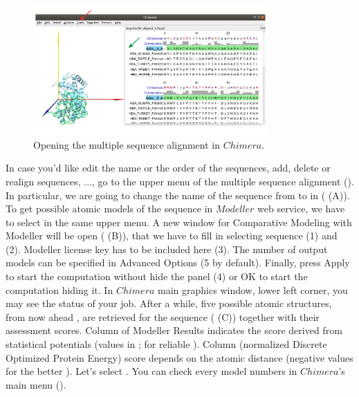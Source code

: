 \begin{itemize}
 \begin{figure}[H]
  \centering 
  \captionsetup{width=.7\linewidth} 
  \includegraphics[width=0.80\textwidth]{Images/Fig14}
  \caption{Opening the multiple sequence alignment in $Chimera$.}
  \label{fig:chimera_alignment}
  \end{figure}
\end{itemize}

In case you'd like edit the name or the order of the sequences, add,  delete or realign sequences, ..., go to the upper menu of the multiple sequence alignment (). In particular, we are going to change the name of the  sequence from  to  in  ( (A)). To get possible atomic models of the  sequence in $Modeller$ web service, we have to select  in the same upper menu. A new window for Comparative Modeling with Modeller will be open ( (B)), that we have to fill in selecting  sequence (1) and  (2). Modeller license key has to be included here (3). The number of output models can be specified in Advanced Options (5 by default). Finally, press Apply to start the computation without hide the panel (4) or OK to start the computation hiding it. In $Chimera$ main graphics window, lower left corner, you may see the status of your job. After a while, five possible atomic structures, from now ahead , are retrieved for the  sequence ( (C)) together with their assessment scores. Column  of Modeller Results indicates the score derived from statistical potentials (values in \ttt{[0,1]};  for reliable ). Column  (normalized Discrete Optimized Protein Energy) score depends on the atomic distance (negative values for the better ). Let's select  . You can check every model numbers in $Chimera$'s main menu ().
 
